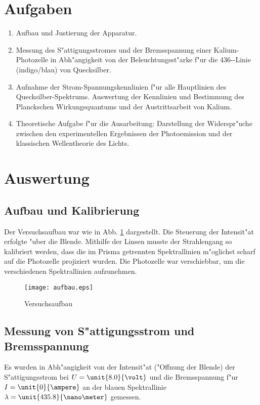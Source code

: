 \documentclass[a4paper,10pt]{article}
\begin{document}
\section{Aufgaben}
  \begin{enumerate}
    \item Aufbau und Justierung der Apparatur.
    \item Messung des S"attigungsstromes und der Bremsspannung einer
      Kalium-Photozelle in Abh"angigkeit von der Beleuchtungsst"arke f"ur
      die 436-\nano\meter-Linie (indigo/blau) von Quecksilber.
    \item Aufnahme der Strom-Spannungskennlinien f"ur alle Hauptlinien
      des Queck\-silber-Spektrums. Auswertung der Kennlinien und Bestimmung
      des Planckschen Wirkungsquantums und der Austrittsarbeit von Kalium.
    \item Theoretische Aufgabe f"ur die Ausarbeitung: Darstellung der
      Widerspr"uche zwischen den experimentellen Ergebnissen der
      Photoemission und der klassischen Wellentheorie des Lichts.
  \end{enumerate}



\clearpage


\section{Auswertung}

  \subsection{Aufbau und Kalibrierung}
    Der Versuchsaufbau war wie in Abb. \ref{aufbau} dargestellt. Die Steuerung der Intensit"at erfolgte "uber die Blende. Mithilfe der Linsen musste der Strahlengang so kalibriert werden, dass die im Prisma getrennten Spektrallinien m"oglichst scharf auf die Photozelle projiziert wurden. Die Photozelle war verschiebbar, um die verschiedenen Spektrallinien aufzunehmen.

    \begin{figure}[h]
      \centering
      \texttt{[image: aufbau.eps]}
      \caption{Versuchsaufbau}
      \label{aufbau}
    \end{figure}


  \subsection{Messung von S"attigungsstrom und Bremsspannung}
    Es wurden in Abh"angigkeit von der Intensit"at ("Offnung der Blende) der S"attigungsstrom bei $U=\unit{8.0}{\volt}$ und die Bremsspannung f"ur $I=\unit{0}{\ampere}$ an der blauen Spektrallinie $\lambda = \unit{435.8}{\nano\meter}$ gemessen.
\end{document}
